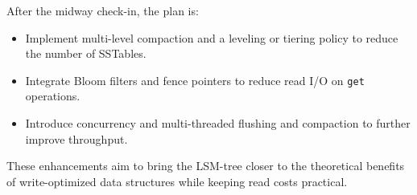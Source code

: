 \documentclass[10pt]{article}
\begin{document}
After the midway check-in, the plan is:
\begin{itemize}
    \item Implement multi-level compaction and a leveling or tiering policy to reduce the number of SSTables.
    \item Integrate Bloom filters and fence pointers to reduce read I/O on \texttt{get} operations.
    \item Introduce concurrency and multi-threaded flushing and compaction to further improve throughput.
\end{itemize}

These enhancements aim to bring the LSM-tree closer to the theoretical benefits of write-optimized data structures while keeping read costs practical.
\end{document}
